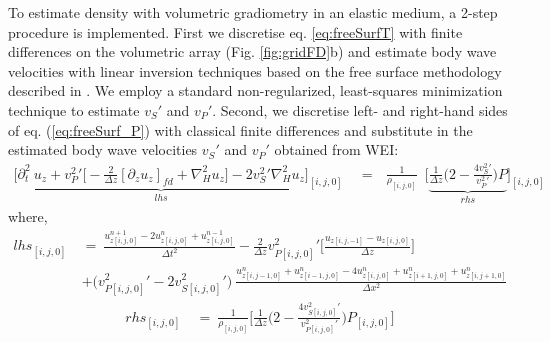 \documentclass{article}
\begin{document}
	To estimate density with volumetric gradiometry in an elastic medium, a 2-step procedure is implemented. First we discretise eq. \eqref{eq:freeSurfT} with finite differences on the volumetric array (Fig. \ref{fig:gridFD}b) and estimate body wave velocities with linear inversion techniques based on the free surface methodology described in \textcite{curtis2002volumetric}. We employ a standard non-regularized, least-squares minimization technique to estimate $v_{S}\prime$ and $v_{P}\prime$. 
	Second, we discretise left- and right-hand sides of eq. (\ref{eq:freeSurf_P}) with classical finite differences and substitute in the estimated body wave velocities $v_{S}\prime$ and $v_{P}\prime$ obtained from WEI:
	\begin{align} 
		\Bigg[\underbrace{\partial_{t}^{2} \: u_{z}  +  v_{P}^{2}\prime \Big[ - \frac{2}{\Delta z}  [\partial_{z} u_{z}]_{fd} +  \nabla_{H}^{2}u_{z} \Big] - 2 v_{S}^{2}\prime \nabla_{H}^{2}u_{z}}_\text{$lhs$}\Bigg]_{[i,j,0]}  \: &=  \: \: \: \frac{1}{\rho_{[i,j,0]}} \: \;  \Bigg[ \underbrace{\frac{1}{\Delta z} \Big( 2 - \frac{4v_{S}^{2}\prime}{v_{P}^{2}\prime}\Big) P}_\text{$rhs$}\Bigg]_{[i,j,0]}
		\label{eq:freeSurf_P2}   
	\end{align}
	where,
	\begin{align} 
		lhs_{[i,j,0]} \:&=\:  \frac{ u_{z[i,j,0]}^{n+1} - 2u_{z[i,j,0]}^{n} + u_{z[i,j,0]}^{n-1} }{\Delta t^{2}} - \frac{2}{\Delta z} v_{P[i,j,0]}^{2}\prime \Bigg[ \frac{u_{z [i,j,-1]}-u_{z [i,j,0]}}{\Delta z}\Bigg] \nonumber\\
		&+ \Big(v_{P[i,j,0]}^{2}\prime - 2v_{S [i,j,0]}^{2}\prime \Big) \: \frac{ u_{z[i,j-1,0]}^{n} + u_{z[i-1,j,0]}^{n} - 4u_{z[i,j,0]}^{n} + u_{z[i+1,j,0]}^{n} + u_{z[i,j+1,0]}^{n}}{\Delta x^{2}}
	\label{eq:FS_discr_LHS} 
	\end{align}
	\begin{align} 
		rhs_{[i,j,0]} \:&=\: \frac{1}{\rho_{[i,j,0]}}  \Bigg[\frac{1}{\Delta z} \Big(2-\frac{4v_{S[i,j,0]}^{2}\prime }{v_{P[i,j,0]}^{2}\prime } \Big) P_{[i,j,0]} \Bigg]
		\label{eq:FS_discr_RHS}   
	\end{align}
	
\end{document}

